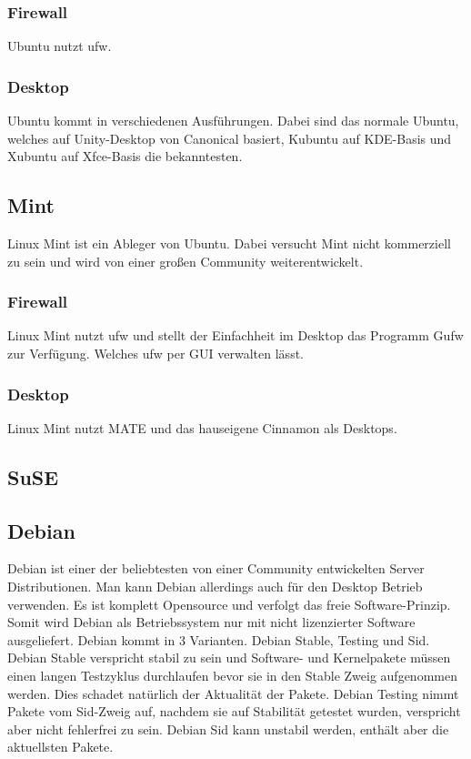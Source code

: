 \documentclass[fontsize=12pt]{scrreprt}
\begin{document}
	\subsubsection{Firewall}
	Ubuntu nutzt ufw.
	\subsubsection{Desktop}
	Ubuntu kommt in verschiedenen Ausführungen. Dabei sind das normale Ubuntu, welches auf Unity-Desktop von Canonical basiert, Kubuntu auf KDE-Basis und Xubuntu auf Xfce-Basis die bekanntesten.
	\subsection{Mint}
	Linux Mint ist ein Ableger von Ubuntu. Dabei versucht Mint nicht kommerziell zu sein und wird von einer großen Community weiterentwickelt.
	\subsubsection{Firewall}
	Linux Mint nutzt ufw und stellt der Einfachheit im Desktop das Programm Gufw zur Verfügung. Welches ufw per GUI verwalten lässt.
	\subsubsection{Desktop}
	Linux Mint nutzt MATE und das hauseigene Cinnamon als Desktops.
	\subsection{SuSE}
	\subsection{Debian}
	Debian ist einer der beliebtesten von einer Community entwickelten Server Distributionen. Man kann Debian allerdings auch für den Desktop Betrieb verwenden. Es ist komplett Opensource und verfolgt das freie Software-Prinzip. Somit wird Debian als Betriebssystem nur mit nicht lizenzierter Software ausgeliefert. Debian kommt in 3 Varianten. Debian Stable, Testing und Sid. Debian Stable verspricht stabil zu sein und Software- und Kernelpakete müssen einen langen Testzyklus durchlaufen bevor sie in den Stable Zweig aufgenommen werden. Dies schadet natürlich der Aktualität der Pakete. Debian Testing nimmt Pakete vom Sid-Zweig auf, nachdem sie auf Stabilität getestet wurden, verspricht aber nicht fehlerfrei zu sein. Debian Sid kann unstabil werden, enthält aber die aktuellsten Pakete.
\end{document}
